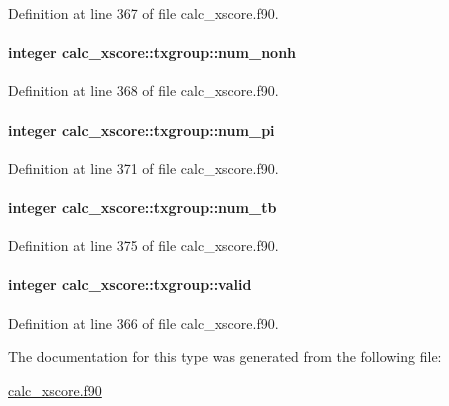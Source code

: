 Definition at line 367 of file calc\-\_\-xscore.\-f90.

\hypertarget{structcalc__xscore_1_1txgroup_a32e05698a71d3ed8d86282cabad31dab}{
\paragraph[{num\-\_\-nonh}]{\setlength{\rightskip}{0pt plus 5cm}integer calc\-\_\-xscore\-::txgroup\-::num\-\_\-nonh}}\label{structcalc__xscore_1_1txgroup_a32e05698a71d3ed8d86282cabad31dab}


Definition at line 368 of file calc\-\_\-xscore.\-f90.

\hypertarget{structcalc__xscore_1_1txgroup_a440ae6a57c205e674847d57683f35ae0}{
\paragraph[{num\-\_\-pi}]{\setlength{\rightskip}{0pt plus 5cm}integer calc\-\_\-xscore\-::txgroup\-::num\-\_\-pi}}\label{structcalc__xscore_1_1txgroup_a440ae6a57c205e674847d57683f35ae0}


Definition at line 371 of file calc\-\_\-xscore.\-f90.

\hypertarget{structcalc__xscore_1_1txgroup_a14b04af12241208595ccd79a129b5f65}{
\paragraph[{num\-\_\-tb}]{\setlength{\rightskip}{0pt plus 5cm}integer calc\-\_\-xscore\-::txgroup\-::num\-\_\-tb}}\label{structcalc__xscore_1_1txgroup_a14b04af12241208595ccd79a129b5f65}


Definition at line 375 of file calc\-\_\-xscore.\-f90.

\hypertarget{structcalc__xscore_1_1txgroup_ad1283f414fe9446823fba548f572469c}{
\paragraph[{valid}]{\setlength{\rightskip}{0pt plus 5cm}integer calc\-\_\-xscore\-::txgroup\-::valid}}\label{structcalc__xscore_1_1txgroup_ad1283f414fe9446823fba548f572469c}


Definition at line 366 of file calc\-\_\-xscore.\-f90.



The documentation for this type was generated from the following file\-:\begin{DoxyCompactItemize}
\item 
\hyperlink{calc__xscore_8f90}{calc\-\_\-xscore.\-f90}\end{DoxyCompactItemize}
